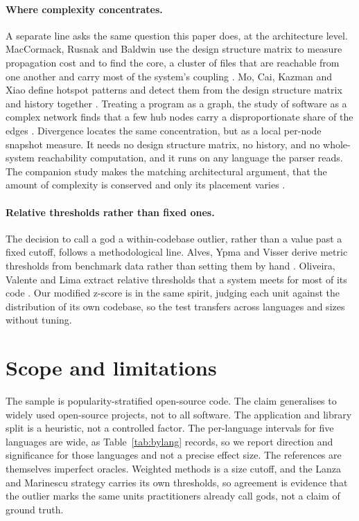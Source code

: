 \documentclass[11pt,a4paper]{article}
\begin{document}
\paragraph{Where complexity concentrates.}
A separate line asks the same question this paper does, at the architecture level.
MacCormack, Rusnak and Baldwin use the design structure matrix to measure
propagation cost and to find the core, a cluster of files that are reachable from
one another and carry most of the system's coupling \cite{maccormack}. Mo, Cai,
Kazman and Xiao define hotspot patterns and detect them from the design structure
matrix and history together \cite{mo}. Treating a program as a graph, the study of
software as a complex network finds that a few hub nodes carry a disproportionate
share of the edges \cite{myers,valverde}. Divergence locates the same
concentration, but as a local per-node snapshot measure. It needs no design
structure matrix, no history, and no whole-system reachability computation, and it
runs on any language the parser reads. The companion study makes the matching
architectural argument, that the amount of complexity is conserved and only its
placement varies \cite{conserved}.

\paragraph{Relative thresholds rather than fixed ones.}
The decision to call a god a within-codebase outlier, rather than a value past a
fixed cutoff, follows a methodological line. Alves, Ypma and Visser derive metric
thresholds from benchmark data rather than setting them by hand \cite{alves}.
Oliveira, Valente and Lima extract relative thresholds that a system meets for most
of its code \cite{oliveira}. Our modified z-score \cite{iglewicz} is in the same
spirit, judging each unit against the distribution of its own codebase, so the test
transfers across languages and sizes without tuning.

\section{Scope and limitations}\label{sec:limits}
The sample is popularity-stratified open-source code. The claim generalises to
widely used open-source projects, not to all software. The application and library
split is a heuristic, not a controlled factor. The per-language intervals for five
languages are wide, as Table~\ref{tab:bylang} records, so we report direction and
significance for those languages and not a precise effect size. The references are
themselves imperfect oracles. Weighted methods is a size cutoff, and the Lanza and
Marinescu strategy carries its own thresholds, so agreement is evidence that the
outlier marks the same units practitioners already call gods, not a claim of ground
truth.
\end{document}
